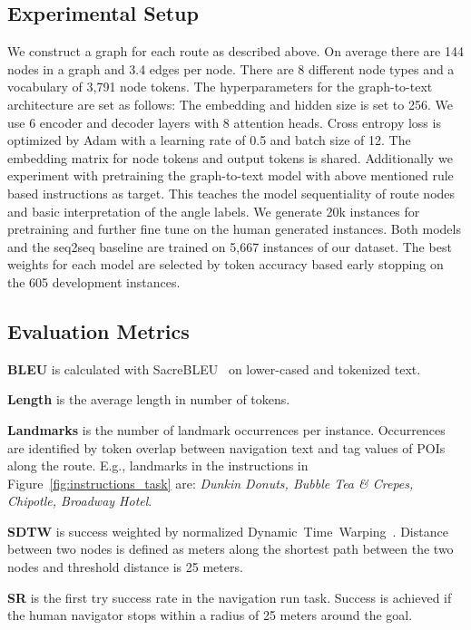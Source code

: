 \documentclass[11pt,a4paper]{article}
\begin{document}
\subsection{Experimental Setup}
We construct a graph for each route as described above. On average there are 144 nodes in a graph and 3.4 edges per node. There are 8 different node types and a vocabulary of 3,791 node tokens. The hyperparameters for the graph-to-text architecture are set as follows: The embedding and hidden size is set to 256. We use 6 encoder and decoder layers with 8 attention heads. Cross entropy loss is optimized by Adam \citep{adam} with a learning rate of 0.5 and batch size of 12. The embedding matrix for node tokens and output tokens is shared. Additionally we experiment with pretraining the graph-to-text model with above mentioned rule based instructions as target. This teaches the model sequentiality of route nodes and basic interpretation of the angle labels. We generate 20k instances for pretraining and further fine tune on the human generated instances. Both models and the seq2seq baseline are trained on 5,667 instances of our dataset. The best weights for each model are selected by token accuracy based early stopping on the 605 development instances.

\subsection{Evaluation Metrics}
\label{sec:eval_metrics}

\textbf{BLEU} is calculated with SacreBLEU~\citep{sacrebleu} on lower-cased and tokenized text.

\noindent\textbf{Length} is the average length in number of tokens.

\noindent\textbf{Landmarks} is the number of landmark occurrences per instance. Occurrences are identified by token overlap between navigation text and tag values of POIs along the route. E.g., landmarks in the instructions in Figure~\ref{fig:instructions_task} are: \textit{Dunkin Donuts, Bubble Tea \& Crepes, Chipotle, Broadway Hotel}.

\noindent\textbf{SDTW} is success weighted by normalized Dynamic~Time~Warping~\citep{ndtw}. Distance between two nodes is defined as meters along the shortest path between the two nodes and threshold distance is 25 meters.

\noindent\textbf{SR} is the first try success rate in the navigation run task. Success is achieved if the human navigator stops within a radius of 25 meters around the goal.
\end{document}
